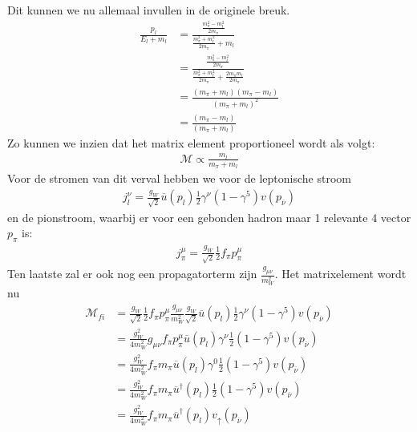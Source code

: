 \documentclass[../main.tex]{subfiles}
\begin{document}
Dit kunnen we nu allemaal invullen in de originele breuk.
\begin{equation}
    \begin{aligned}
        \label{eq:omvormen_breuk_pion_verval}
        \frac{p_l}{E_l+m_l} &= \frac{\frac{m_\pi^2-m_l^2}{2m_\pi}}{\frac{m_\pi^2 + m_l^2}{2m_\pi}+m_l}\\
                            &= \frac{\frac{m_\pi^2-m_l^2}{2m_\pi}}{\frac{m_\pi^2 + m_l^2}{2m_\pi}+\frac{2m_\pi m_l}{2m_\pi}}\\
                            &= \frac{(m_\pi+m_l)(m_\pi-m_l)}{(m_\pi+m_l)^2}\\
                            &= \frac{(m_\pi-m_l)}{(m_\pi+m_l)}
    \end{aligned}
\end{equation}
Zo kunnen we inzien dat het matrix element proportioneel wordt als volgt:
\begin{equation}
    \begin{aligned}
        \label{eq:pion_verval_matrix_2}
        \mathcal{M} \propto \frac{m_l}{m_\pi + m_l} 
    \end{aligned}
\end{equation}
Voor de stromen van dit verval hebben we voor de leptonische stroom
\begin{equation}
    \begin{aligned}
        \label{eq:pion_verval_lept_stroom}
        j_l^\nu = \frac{g_W}{\sqrt{2}} \overline u(p_l) \frac{1}{2} \gamma^\nu (1-\gamma^5)v(p_{\overline \nu})
    \end{aligned}
\end{equation}
en de pionstroom, waarbij er voor een gebonden hadron maar 1 relevante 4 vector $p_\pi$ is:
\begin{equation}
    \begin{aligned}
        \label{eq:pion_verval_pion_stroom}
        j_\pi^\mu = \frac{g_W}{\sqrt{2}} \frac{1}{2} f_\pi p_\pi^\mu
    \end{aligned}
\end{equation}
Ten laatste zal er ook nog een propagatorterm zijn $ \frac{g_{\mu\nu}}{m_W^2} $. Het matrixelement wordt nu
\begin{equation}
    \begin{aligned}
        \label{eq:pion_verval_matrix_3}
        \mathcal{M}_{fi} &= \frac{g_W}{\sqrt{2}} \frac{1}{2} f_\pi p_\pi^\mu \frac{g_{\mu\nu}}{m_W^2} \frac{g_W}{\sqrt{2}} \overline u(p_l) \frac{1}{2} \gamma^\nu (1-\gamma^5)v(p_{\overline \nu})\\
                         &= \frac{g_W^2}{4m_W^2} g_{\mu\nu} f_\pi p_\pi^\mu \overline u(p_l) \gamma^\nu \frac{1}{2} (1-\gamma^5)v(p_{\overline \nu})\\
                         &= \frac{g_W^2}{4m_W^2} f_\pi m_\pi \overline u(p_l) \gamma^0 \frac{1}{2} (1-\gamma^5)v(p_{\overline \nu})\\
                         &= \frac{g_W^2}{4m_W^2} f_\pi m_\pi \overline u^\dagger(p_l) \frac{1}{2} (1-\gamma^5)v(p_{\overline \nu})\\
                         &= \frac{g_W^2}{4m_W^2} f_\pi m_\pi \overline u^\dagger(p_l)v_\uparrow(p_{\overline \nu})
    \end{aligned}
\end{equation}
\end{document}

